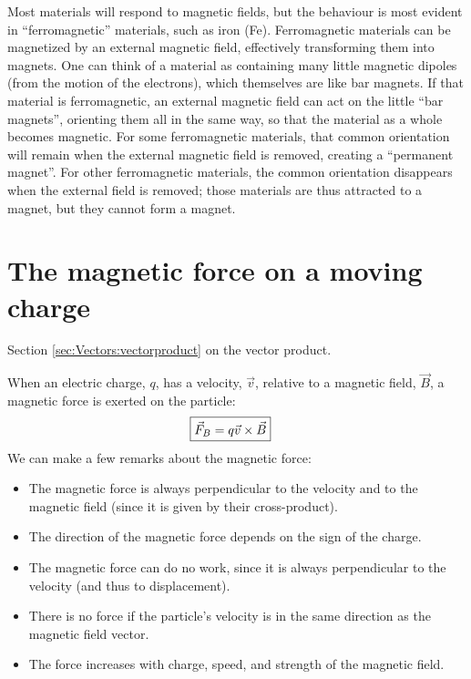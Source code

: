 Most materials will respond to magnetic fields, but the behaviour is most evident in ``ferromagnetic'' materials, such as iron (Fe). Ferromagnetic materials can be magnetized by an external magnetic field, effectively transforming them into magnets. One can think of a material as containing many little magnetic dipoles (from the motion of the electrons), which themselves are like bar magnets. If that material is ferromagnetic,  an external magnetic field can act on the little ``bar magnets'', orienting them all in the same way, so that the material as a whole becomes magnetic. For some ferromagnetic materials, that common orientation will remain when the external magnetic field is removed, creating a ``permanent magnet''. For other ferromagnetic materials, the common orientation disappears when the external field is removed; those materials are thus attracted to a magnet, but they cannot form a magnet. 
  
\section{The magnetic force on a moving charge}
\begin{review}
	\item Section \ref{sec:Vectors:vectorproduct} on the vector product.
\end{review}
When an electric charge, $q$, has a velocity, $\vec v$, relative to a magnetic field, $\vec B$, a magnetic force is exerted on the particle:
\begin{align*}
\Aboxed{\vec F_B = q \vec v \times \vec B}
\end{align*}
We can make a few remarks about the magnetic force:
\begin{itemize}
\item The magnetic force is always perpendicular to the velocity and to the magnetic field (since it is given by their cross-product).
\item The direction of the magnetic force depends on the sign of the charge.
\item The magnetic force can do no work, since it is always perpendicular to the velocity (and thus to displacement).
\item There is no force if the particle's velocity is in the same direction as the magnetic field vector. 
\item The force increases with charge, speed, and strength of the magnetic field.
\end{itemize}

